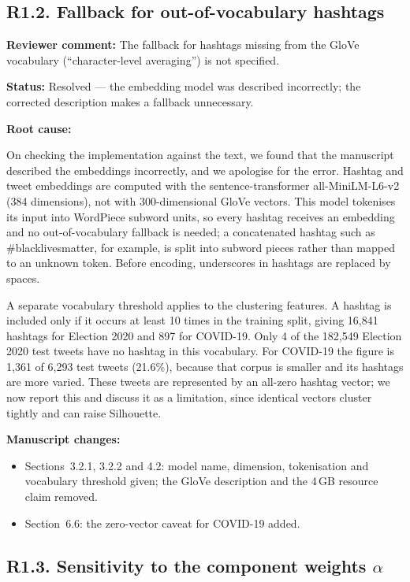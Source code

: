 \documentclass[11pt,a4paper]{article}
\newcommand{\status}[1]{\textbf{\color{statusgreen}Status:} #1}
\newcommand{\parthead}[1]{\par\medskip\textbf{#1}\par}
\begin{document}
\subsection{R1.2. Fallback for out-of-vocabulary hashtags}

\begin{revcomment}
\textbf{Reviewer comment:} The fallback for hashtags missing from the GloVe vocabulary (``character-level averaging'') is not specified.
\end{revcomment}

\status{Resolved --- the embedding model was described incorrectly; the corrected description makes a fallback unnecessary.}

\parthead{Root cause:}
On checking the implementation against the text, we found that the manuscript described the embeddings incorrectly, and we apologise for the error. Hashtag and tweet embeddings are computed with the sentence-transformer all-MiniLM-L6-v2 (384 dimensions), not with 300-dimensional GloVe vectors. This model tokenises its input into WordPiece subword units, so every hashtag receives an embedding and no out-of-vocabulary fallback is needed; a concatenated hashtag such as \#blacklivesmatter, for example, is split into subword pieces rather than mapped to an unknown token. Before encoding, underscores in hashtags are replaced by spaces.

A separate vocabulary threshold applies to the clustering features. A hashtag is included only if it occurs at least 10 times in the training split, giving 16,841 hashtags for Election 2020 and 897 for COVID-19. Only 4 of the 182,549 Election 2020 test tweets have no hashtag in this vocabulary. For COVID-19 the figure is 1,361 of 6,293 test tweets (21.6\%), because that corpus is smaller and its hashtags are more varied. These tweets are represented by an all-zero hashtag vector; we now report this and discuss it as a limitation, since identical vectors cluster tightly and can raise Silhouette.

\parthead{Manuscript changes:}
\begin{itemize}
\item Sections~3.2.1, 3.2.2 and 4.2: model name, dimension, tokenisation and vocabulary threshold given; the GloVe description and the 4\,GB resource claim removed.
\item Section~6.6: the zero-vector caveat for COVID-19 added.
\end{itemize}

\subsection{R1.3. Sensitivity to the component weights $\alpha$}
\end{document}
